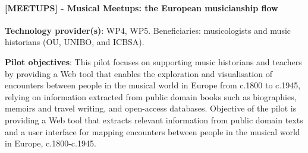 
\paragraph*{[MEETUPS] - Musical Meetups: the European musicianship flow}\label{sec:pilot:meetups}

\textbf{Technology provider(s)}: WP4, WP5.
Beneficiaries: musicologists and music historians (OU, UNIBO, and ICBSA). 

\textbf{Pilot objectives}: This pilot focuses on supporting music historians and teachers by providing a Web tool that enables the exploration and visualisation of encounters between people in the musical world in Europe from c.1800 to c.1945, relying on information extracted from public domain books such as biographies, memoirs and travel writing, and open-access databases. Objective of the pilot is providing a Web tool that extracts relevant information from public domain texts and a user interface for mapping encounters between people in the musical world in Europe, c.1800-c.1945. 

